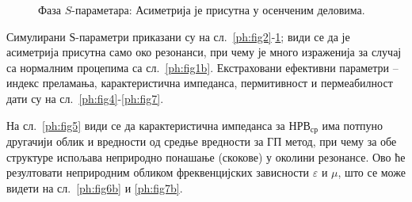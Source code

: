 \documentclass[main.tex]{subfiles}
\begin{document}
\begin{figure}[!t]
\centering
{}\hfill
\caption{Фаза $S$-параметара:  Асиметрија је присутна у осенченим деловима.}
\label{ph:fig3}
\end{figure} 
Симулирани $Ѕ$-параметри приказани су на сл.~\ref{ph:fig2}-\ref{ph:fig3}; види се да је асиметрија присутна само око резонанси, при чему је много израженија за случај са нормалним процепима са сл.~\ref{ph:fig1b}. Екстраховани ефективни параметри -- индекс преламања, карактеристична импеданса, пермитивност и пермеабилност дати су на сл.~\ref{ph:fig4}-\ref{ph:fig7}.

На сл.~\ref{ph:fig5} види се да карактеристична импеданса за $НРВ_{ср}$ има потпуно другачији облик и вредности од средње вредности за ГП метод, при чему за обе структуре испољава неприродно понашање (скокове) у околини резонансе. Ово ће резултовати неприродним обликом фреквенцијских зависности $\varepsilon$ и $\mu$, што се може видети на сл.~\ref{ph:fig6b} и \ref{ph:fig7b}.
\end{document}
